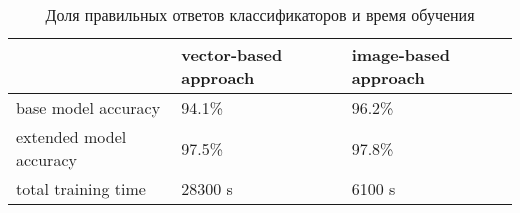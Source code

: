 \begin{table}[h]
\begin{tabular}{|l|l|l|}
\hline
                        & vector-based approach & image-based approach \\ \hline
base model accuracy     & 94.1\%                & 96.2\%               \\ \hline
extended model accuracy & 97.5\%                & 97.8\%               \\ \hline
total training time     & 28300 s               & 6100 s               \\ \hline
\end{tabular}
\caption{Доля правильных ответов классификаторов и время обучения}
\label{results_ep}
\end{table}